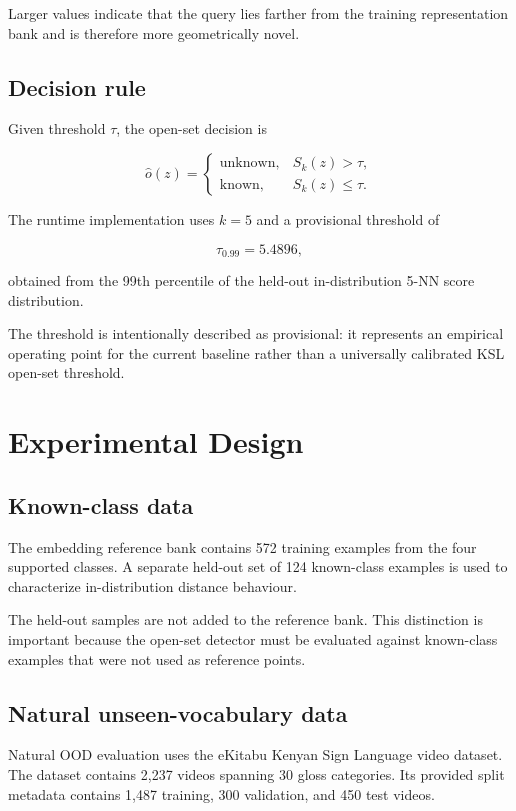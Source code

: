 \documentclass[11pt]{article}
\begin{document}
Larger values indicate that the query lies farther from
the training representation bank and is therefore more
geometrically novel.


\subsection{Decision rule}

Given threshold $\tau$, the open-set decision is

\[
\widehat{o}(z)
=
\begin{cases}
\mathrm{unknown},
&
S_k(z) > \tau,
\\[4pt]
\mathrm{known},
&
S_k(z) \leq \tau.
\end{cases}
\]

The runtime implementation uses $k=5$ and a provisional
threshold of

\[
\tau_{0.99}=5.4896,
\]

obtained from the 99th percentile of the held-out
in-distribution 5-NN score distribution.

The threshold is intentionally described as provisional:
it represents an empirical operating point for the current
baseline rather than a universally calibrated KSL
open-set threshold.


\section{Experimental Design}

\subsection{Known-class data}

The embedding reference bank contains 572 training examples
from the four supported classes. A separate held-out set of
124 known-class examples is used to characterize
in-distribution distance behaviour.

The held-out samples are not added to the reference bank.
This distinction is important because the open-set detector
must be evaluated against known-class examples that were not
used as reference points.


\subsection{Natural unseen-vocabulary data}

Natural OOD evaluation uses the eKitabu Kenyan Sign Language
video dataset. The dataset contains 2,237 videos spanning
30 gloss categories. Its provided split metadata contains
1,487 training, 300 validation, and 450 test videos.
\end{document}
